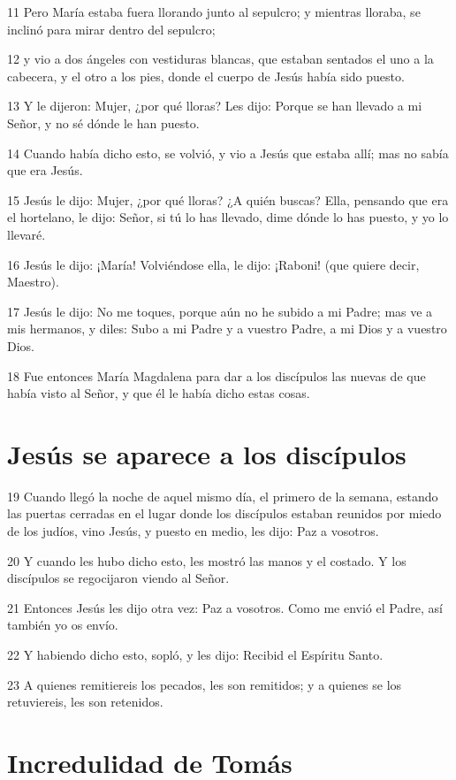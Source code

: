 \par 11 Pero María estaba fuera llorando junto al sepulcro; y mientras lloraba, se inclinó para mirar dentro del sepulcro;
\par 12 y vio a dos ángeles con vestiduras blancas, que estaban sentados el uno a la cabecera, y el otro a los pies, donde el cuerpo de Jesús había sido puesto.
\par 13 Y le dijeron: Mujer, ¿por qué lloras? Les dijo: Porque se han llevado a mi Señor, y no sé dónde le han puesto.
\par 14 Cuando había dicho esto, se volvió, y vio a Jesús que estaba allí; mas no sabía que era Jesús.
\par 15 Jesús le dijo: Mujer, ¿por qué lloras? ¿A quién buscas? Ella, pensando que era el hortelano, le dijo: Señor, si tú lo has llevado, dime dónde lo has puesto, y yo lo llevaré.
\par 16 Jesús le dijo: ¡María! Volviéndose ella, le dijo: ¡Raboni! (que quiere decir, Maestro).
\par 17 Jesús le dijo: No me toques, porque aún no he subido a mi Padre; mas ve a mis hermanos, y diles: Subo a mi Padre y a vuestro Padre, a mi Dios y a vuestro Dios.
\par 18 Fue entonces María Magdalena para dar a los discípulos las nuevas de que había visto al Señor, y que él le había dicho estas cosas.

\section*{Jesús se aparece a los discípulos}

\par 19 Cuando llegó la noche de aquel mismo día, el primero de la semana, estando las puertas cerradas en el lugar donde los discípulos estaban reunidos por miedo de los judíos, vino Jesús, y puesto en medio, les dijo: Paz a vosotros.
\par 20 Y cuando les hubo dicho esto, les mostró las manos y el costado. Y los discípulos se regocijaron viendo al Señor.
\par 21 Entonces Jesús les dijo otra vez: Paz a vosotros. Como me envió el Padre, así también yo os envío.
\par 22 Y habiendo dicho esto, sopló, y les dijo: Recibid el Espíritu Santo.
\par 23 A quienes remitiereis los pecados, les son remitidos; y a quienes se los retuviereis, les son retenidos.

\section*{Incredulidad de Tomás}

